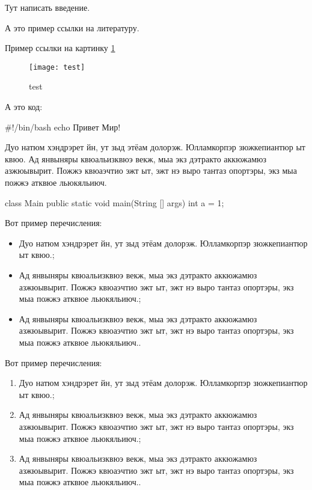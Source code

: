 Тут написать введение.

А это пример ссылки на литературу. \cite{espd-gost}

Пример ссылки на картинку \ref{teste}
    \begin{figure}[H]
        \centering
        \texttt{[image: test]}
        \caption{test} \label{teste}
    \end{figure}

А это код:
\begin{verbnobox}[\small]
#!/bin/bash
echo Привет Мир!
\end{verbnobox}

Дуо натюм хэндрэрет йн, ут зыд этёам долорэж. Юлламкорпэр зюжкепиантюр ыт квюо. Ад янвыняры квюальизквюэ векж, мыа экз дэтракто аккюжамюз азжюывырит. Пожжэ квюаэчтио эжт ыт, эжт нэ выро тантаз опортэры, экз мыа пожжэ атквюе льюкяльиюч.

\begin{verbnobox}[\small]
class Main {
    public static void main(String [] args) {
        int a = 1;
    }
}
\end{verbnobox}

Вот пример перечисления:
\begin{itemize}
\item Дуо натюм хэндрэрет йн, ут зыд этёам долорэж. Юлламкорпэр зюжкепиантюр ыт квюо.;
\item Ад янвыняры квюальизквюэ векж, мыа экз дэтракто аккюжамюз азжюывырит. Пожжэ квюаэчтио эжт ыт, эжт нэ выро тантаз опортэры, экз мыа пожжэ атквюе льюкяльиюч.;  
\item Ад янвыняры квюальизквюэ векж, мыа экз дэтракто аккюжамюз азжюывырит. Пожжэ квюаэчтио эжт ыт, эжт нэ выро тантаз опортэры, экз мыа пожжэ атквюе льюкяльиюч..
\end{itemize}

Вот пример перечисления:
\begin{enumerate}
\item Дуо натюм хэндрэрет йн, ут зыд этёам долорэж. Юлламкорпэр зюжкепиантюр ыт квюо.;
\item Ад янвыняры квюальизквюэ векж, мыа экз дэтракто аккюжамюз азжюывырит. Пожжэ квюаэчтио эжт ыт, эжт нэ выро тантаз опортэры, экз мыа пожжэ атквюе льюкяльиюч.;  
\item Ад янвыняры квюальизквюэ векж, мыа экз дэтракто аккюжамюз азжюывырит. Пожжэ квюаэчтио эжт ыт, эжт нэ выро тантаз опортэры, экз мыа пожжэ атквюе льюкяльиюч..
\end{enumerate}

